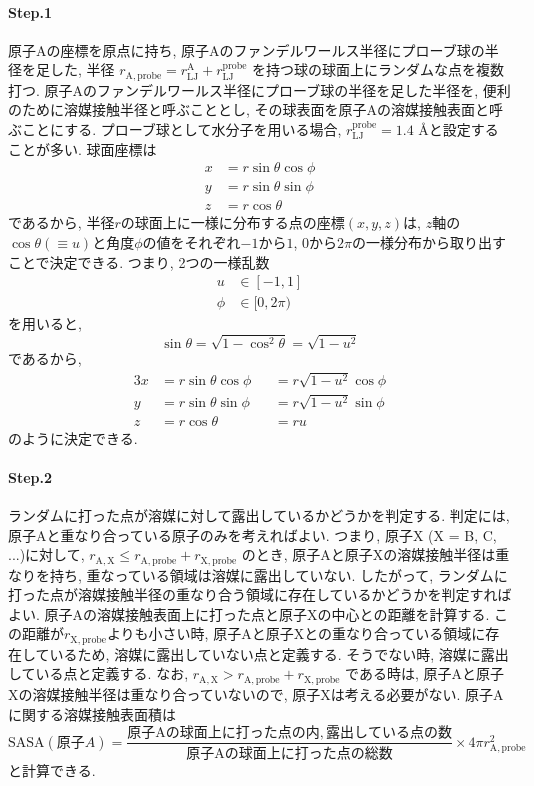\paragraph{Step.1} 原子Aの座標を原点に持ち, 原子Aのファンデルワールス半径にプローブ球の半径を足した, 半径
$r_{\mathrm{A, probe}} = r_{\mathrm{LJ}}^{\mathrm{A}} + r_{\mathrm{LJ}}^{\mathrm{probe}}$
を持つ球の球面上にランダムな点を複数打つ. 
原子Aのファンデルワールス半径にプローブ球の半径を足した半径を, 便利のために溶媒接触半径と呼ぶこととし, その球表面を原子Aの溶媒接触表面と呼ぶことにする. 
プローブ球として水分子を用いる場合, $r_{\mathrm{LJ}}^{\mathrm{probe}} = 1.4$ {\AA}と設定することが多い. 
球面座標は
\begin{align}
    x &= r \sin\theta \cos\phi \\
    y &= r \sin\theta \sin\phi \\
    z &= r \cos\theta
\end{align}
であるから, 半径$r$の球面上に一様に分布する点の座標$(x, y, z)$は, $z$軸の$\cos\theta (\equiv u)$と角度$\phi$の値をそれぞれ$-1$から$1$, $0$から$2\pi$の一様分布から取り出すことで決定できる. 
つまり, 2つの一様乱数
\begin{align}
    u    &\in [-1, 1] \\
    \phi &\in [0, 2\pi)
\end{align}
を用いると, 
\begin{equation}
    \sin \theta = \sqrt{1 - \cos^{2} \theta} = \sqrt{1 - u^{2}}
\end{equation}
であるから, 
\begin{alignat}{3}
    x &= r \sin\theta \cos\phi &&= r \sqrt{1 - u^{2}} \cos\phi \\
    y &= r \sin\theta \sin\phi &&= r \sqrt{1 - u^{2}} \sin\phi \\
    z &= r \cos\theta          &&= r u
\end{alignat}
のように決定できる. 

\paragraph{Step.2} ランダムに打った点が溶媒に対して露出しているかどうかを判定する. 
判定には, 原子Aと重なり合っている原子のみを考えればよい. 
つまり, 原子X (X = B, C, ...)に対して, 
$
r_{\mathrm{A, X}} \le r_{\mathrm{A, probe}} + r_{\mathrm{X, probe}}
$
のとき, 原子Aと原子Xの溶媒接触半径は重なりを持ち, 重なっている領域は溶媒に露出していない. 
したがって, ランダムに打った点が溶媒接触半径の重なり合う領域に存在しているかどうかを判定すればよい. 
原子Aの溶媒接触表面上に打った点と原子Xの中心との距離を計算する. 
この距離が$r_{\mathrm{X, probe}}$よりも小さい時, 原子Aと原子Xとの重なり合っている領域に存在しているため, 溶媒に露出していない点と定義する. そうでない時, 溶媒に露出している点と定義する. 
なお, 
$
r_{\mathrm{A, X}} > r_{\mathrm{A, probe}} + r_{\mathrm{X, probe}}
$
である時は, 原子Aと原子Xの溶媒接触半径は重なり合っていないので, 原子Xは考える必要がない. 
原子Aに関する溶媒接触表面積は
\begin{equation}
    \mathrm{SASA} (\mathrm{原子}A)
    =
    \frac{\mathrm{原子Aの球面上に打った点の内, 露出している点の数}}{\mathrm{原子Aの球面上に打った点の総数}} \times 4 \pi r_{\mathrm{A, probe}}^{2}
\end{equation}
と計算できる. 

